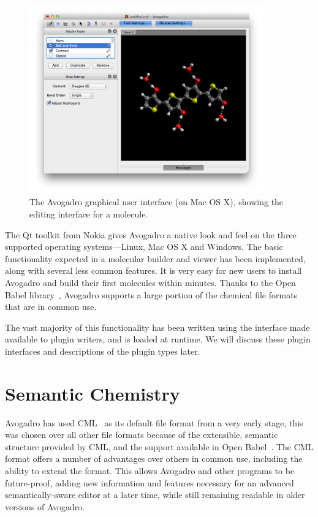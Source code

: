 \documentclass[10pt]{bmc_article}
\newenvironment{bmcformat}{\begin{raggedright}
\baselineskip20pt\sloppy\setboolean{publ}{false}}{\end{raggedright}
\baselineskip20pt\sloppy}
\begin{document}
\begin{bmcformat}
\begin{figure}
  \begin{center}
    \includegraphics[width=0.9\textwidth]{images/avogadro-drawing}
  \end{center}
  \caption{The Avogadro graphical user interface (on Mac OS X), showing the
editing interface
for a molecule.}
  \label{f:avogadrogui}
\end{figure}

The Qt toolkit from Nokia gives Avogadro a native look and feel on the three
supported operating systems---Linux, Mac OS X and Windows. The basic
functionality expected in a molecular builder and viewer has been implemented,
along with several less common features. It is very easy for new users to
install Avogadro and build their
first molecules within minutes. Thanks to the Open Babel library~\cite{OpenBabel}, Avogadro
supports a large portion of the chemical file formats that are in
common use.

The vast majority of this functionality has been written using the
interface made available to plugin writers, and is loaded at
runtime. We will discuss these plugin interfaces and descriptions of
the plugin types later.

\section{Semantic Chemistry}

Avogadro has used CML~\cite{CML2011a, CML2011b} as its default file format from
a very early stage, this
was chosen over all other file formats because of the extensible,
semantic structure provided by CML, and the support available in Open Babel~\cite{OpenBabel}. The CML
format offers a number of advantages over others in common use, including the
ability to extend the format. This allows Avogadro and other programs
to be future-proof, adding new information and features
necessary for an advanced semantically-aware editor at a later time,
while still remaining readable in older versions of Avogadro.


\end{bmcformat}
\end{document}
